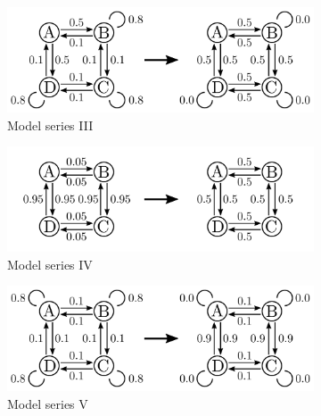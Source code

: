 \begin{figure}[p]
    \centering
    \begin{subfigure}{0.85\textwidth}
    	\centering
        \includegraphics[width=\textwidth]{results/mc3_models}
        \vspace{-25pt}
        \caption{Model series III}
        \label{fig:mc3-models}
    \end{subfigure}
    \begin{subfigure}{0.85\textwidth}
    	\centering
        \includegraphics[width=\textwidth]{results/mc4_models}
        \vspace{-30pt}
        \caption{Model series IV}
        \label{fig:mc4-models}
    \end{subfigure}
    \begin{subfigure}{0.85\textwidth}
    	\centering
        \includegraphics[width=\textwidth]{results/mc5_models}
        \vspace{-25pt}
        \caption{Model series V}
        \label{fig:mc5-models}
    \end{subfigure}
    \begin{subfigure}{0.85\textwidth}
    	\centering

\end{subfigure}
\end{figure}
